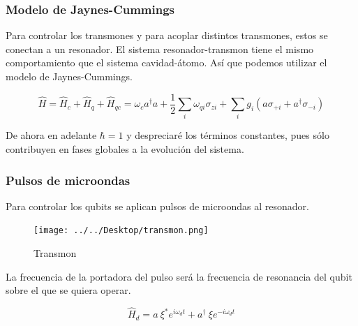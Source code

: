 \documentclass[xetex,mathserif,serif, 8pt]{beamer}
\begin{document}
\begin{frame}
    \frametitle{Modelo de Jaynes-Cummings}

    Para controlar los transmones y para acoplar distintos transmones, estos se conectan a un resonador. El sistema resonador-transmon tiene el mismo comportamiento que el sistema cavidad-átomo. Así que podemos utilizar el modelo de Jaynes-Cummings.

    \begin{equation}
        \hat{H} = \hat{H}_c + \hat{H}_q + \hat{H}_{qc} = \omega_c a^\dag a +
        \frac{1}{2} \sum\limits_i \omega_{qi} \sigma_{zi} + \sum\limits_i g_i (a \sigma_{+ i} + a^\dagger \sigma_{- i})
  \end{equation}

\justify
De ahora en adelante $\hbar = 1$ y despreciaré los términos constantes, pues 
sólo contribuyen en fases globales a la evolución del sistema.

\end{frame}

\begin{frame}
    \frametitle{Pulsos de microondas}

    Para controlar los qubits se aplican pulsos de microondas al resonador. 

    \begin{figure}[H]
    \centering \texttt{[image: ../../Desktop/transmon.png]}
    \caption{Transmon \cite{wendin}}
    \label{fig:transmon}
    \end{figure}
	
	La frecuencia de la portadora del pulso será la frecuencia de resonancia del qubit sobre el que se quiera operar.

    \begin{equation}
        \hat{H}_d= a \ \xi^* e^{i\omega_d t} + a^\dagger \ \xi e^{-i\omega_d t}
    \end{equation}

\end{frame}
  
\end{document}
